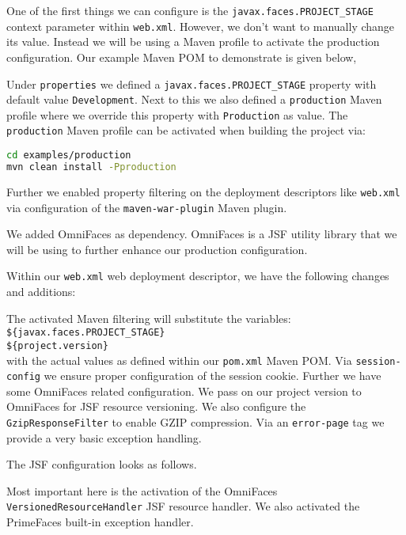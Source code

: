One of the first things we can configure is the \texttt{javax.\allowbreak faces.PROJECT\_STAGE} context parameter within \texttt{web.xml}.
However, we don't want to manually change its value.
Instead we will be using a Maven profile to activate the production configuration.
Our example Maven POM to demonstrate is given below,

Under \texttt{properties} we defined a \texttt{javax.\allowbreak faces.PROJECT\_STAGE} property with default value \texttt{Development}.
Next to this we also defined a \texttt{production} Maven profile where we override this property with \texttt{Production} as value.
The \texttt{production} Maven profile can be activated when building the project via:
\begin{lstlisting}[language=bash]
cd examples/production
mvn clean install -Pproduction
\end{lstlisting}
Further we enabled property filtering on the deployment descriptors like \texttt{web.xml} via configuration of the \texttt{maven\allowbreak-war\allowbreak-plugin} Maven plugin.

We added OmniFaces \cite{omnifaces} as dependency.
OmniFaces is a JSF utility library that we will be using to further enhance our production configuration.

Within our \texttt{web.xml} web deployment descriptor, we have the following changes and additions:

The activated Maven filtering will substitute the variables:\\
\indent \texttt{\$\{javax.faces.PROJECT\_STAGE\}}\\
\indent \texttt{\$\{project.version\}}\\
with the actual values as defined within our \texttt{pom.xml} Maven POM.
Via \texttt{session-config} we ensure proper configuration of the session cookie.
Further we have some OmniFaces related configuration.
We pass on our project version to OmniFaces for JSF resource versioning.
We also configure the \texttt{GzipResponseFilter} to enable GZIP compression.
Via an \texttt{error-page} tag we provide a very basic exception handling.

The JSF configuration looks as follows.

Most important here is the activation of the OmniFaces \texttt{VersionedResourceHandler} JSF resource handler.
We also activated the PrimeFaces built-in exception handler.

